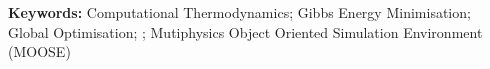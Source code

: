 %

\bigskip
\bigskip
\bigskip
\bigskip

\noindent
\textbf{Keywords:} Computational Thermodynamics; Gibbs Energy Minimisation; Global Optimisation; {\GEM}; Mutiphysics Object Oriented Simulation Environment (MOOSE)
